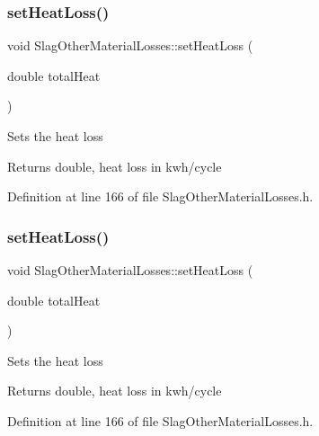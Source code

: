\subsubsection{\texorpdfstring{set\+Heat\+Loss()}{setHeatLoss()}\hspace{0.1cm}{\footnotesize\ttfamily [1/3]}}
{\footnotesize\ttfamily void Slag\+Other\+Material\+Losses\+::set\+Heat\+Loss (\begin{DoxyParamCaption}\item[{double}]{total\+Heat }\end{DoxyParamCaption})\hspace{0.3cm}{\ttfamily [inline]}}

Sets the heat loss

\begin{DoxyReturn}{Returns}
double, heat loss in kwh/cycle 
\end{DoxyReturn}


Definition at line 166 of file Slag\+Other\+Material\+Losses.\+h.

\mbox{\label{class_slag_other_material_losses_a33d59aed5492ec2912615e93b6ff273e}} 
\subsubsection{\texorpdfstring{set\+Heat\+Loss()}{setHeatLoss()}\hspace{0.1cm}{\footnotesize\ttfamily [2/3]}}
{\footnotesize\ttfamily void Slag\+Other\+Material\+Losses\+::set\+Heat\+Loss (\begin{DoxyParamCaption}\item[{double}]{total\+Heat }\end{DoxyParamCaption})\hspace{0.3cm}{\ttfamily [inline]}}

Sets the heat loss

\begin{DoxyReturn}{Returns}
double, heat loss in kwh/cycle 
\end{DoxyReturn}


Definition at line 166 of file Slag\+Other\+Material\+Losses.\+h.

\mbox{\label{class_slag_other_material_losses_a33d59aed5492ec2912615e93b6ff273e}} 
